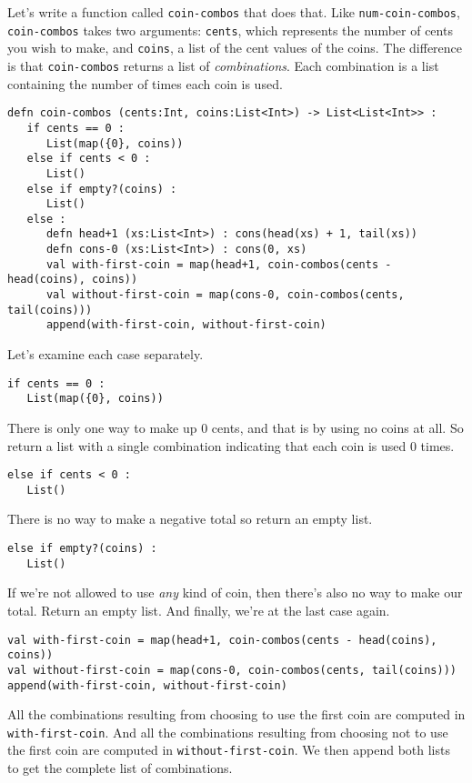 \documentclass[10pt,oneside]{book}
\begin{document}
Let's write a function called \texttt{\frenchspacing coin-combos} that does that. Like \texttt{\frenchspacing num-coin-combos}, \texttt{\frenchspacing coin-combos} takes two arguments: \texttt{\frenchspacing cents}, which represents the number of cents you wish to make, and \texttt{\frenchspacing coins}, a list of the cent values of the coins. The difference is that \texttt{\frenchspacing coin-combos} returns a list of {\em combinations}. Each combination is a list containing the number of times each coin is used.
\begin{lstlisting}
defn coin-combos (cents:Int, coins:List<Int>) -> List<List<Int>> :
   if cents == 0 :
      List(map({0}, coins))
   else if cents < 0 :
      List()
   else if empty?(coins) :
      List()
   else :
      defn head+1 (xs:List<Int>) : cons(head(xs) + 1, tail(xs))
      defn cons-0 (xs:List<Int>) : cons(0, xs)
      val with-first-coin = map(head+1, coin-combos(cents - head(coins), coins))
      val without-first-coin = map(cons-0, coin-combos(cents, tail(coins)))
      append(with-first-coin, without-first-coin)
\end{lstlisting}
Let's examine each case separately.
\begin{lstlisting}
if cents == 0 :
   List(map({0}, coins))
\end{lstlisting}
There is only one way to make up 0 cents, and that is by using no coins at all. So return a list with a single combination indicating that each coin is used 0 times. 
\begin{lstlisting}
else if cents < 0 :
   List()
\end{lstlisting}
There is no way to make a negative total so return an empty list.
\begin{lstlisting}
else if empty?(coins) :
   List()
\end{lstlisting}
If we're not allowed to use {\em any} kind of coin, then there's also no way to make our total. Return an empty list.
And finally, we're at the last case again.
\begin{lstlisting}
val with-first-coin = map(head+1, coin-combos(cents - head(coins), coins))
val without-first-coin = map(cons-0, coin-combos(cents, tail(coins)))
append(with-first-coin, without-first-coin)
\end{lstlisting}
All the combinations resulting from choosing to use the first coin are computed in \texttt{\frenchspacing with-first-coin}. And all the combinations resulting from choosing not to use the first coin are computed in \texttt{\frenchspacing without-first-coin}. We then append both lists to get the complete list of combinations.
\end{document}
